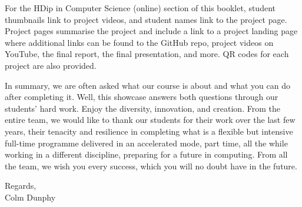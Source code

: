 \vspace{0.4cm}
For the HDip in Computer Science (online) section of this booklet, student thumbnails link to project videos, and student names link to the project page. Project pages summarise the project and include a link to a project landing page where additional links can be found to the GitHub repo, project videos on YouTube, the final report, the final presentation, and more. QR codes for each project are also provided.

\vspace{0.4cm}
In summary, we are often asked what our course is about and what you can do after completing it. Well, this showcase answers both questions through our students' hard work. Enjoy the diversity, innovation, and creation. From the entire team, we would like to thank our students for their work over the last few years, their tenacity and resilience in completing what is a flexible but intensive full-time programme delivered in an accelerated mode, part time, all the while working in a different discipline, preparing for a future in computing. From all the team, we wish you every success, which you will no doubt have in the future.

\vspace{0.4cm}
Regards,\\
Colm Dunphy 

\vspace{-0.3cm}

\clearpage
